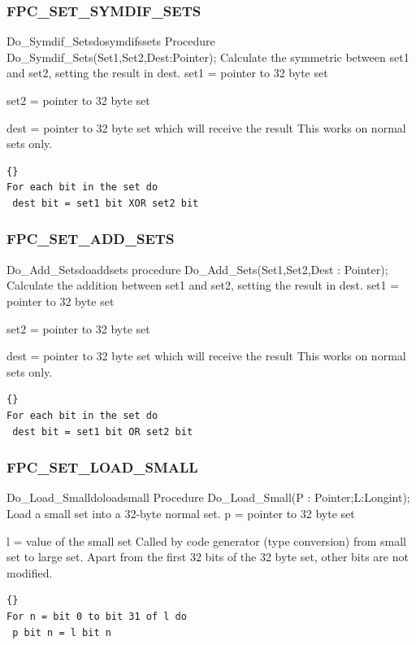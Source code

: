 \documentclass [12pt]{article}
\begin{document}
\subsubsection{FPC{\_}SET{\_}SYMDIF{\_}SETS}
\label{subsubsec:mylabel93}

\begin{procedurel}{Do{\_}Symdif{\_}Sets}{dosymdifssets}
\Declaration
Procedure Do{\_}Symdif{\_}Sets(Set1,Set2,Dest:Pointer);
\Description 
Calculate the symmetric between \textsf{set1} and \textsf{set2}, setting the
result in \textsf{dest}.
\Parameters 
set1 = pointer to 32 byte set \par
set2 = pointer to 32 byte set \par
dest = pointer to 32 byte set which will receive the result 
\Notes 
This works on normal sets only. 
\Algorithm 
\begin{lstlisting}{}
For each bit in the set do 
 dest bit = set1 bit XOR set2 bit
\end{lstlisting}
\end{procedurel}

\subsubsection{FPC{\_}SET{\_}ADD{\_}SETS}
\label{subsubsec:mylabel94}

\begin{procedurel}{Do{\_}Add{\_}Sets}{doaddsets}
\Declaration
procedure Do{\_}Add{\_}Sets(Set1,Set2,Dest : Pointer);
\Description 
Calculate the addition between \textsf{set1} and \textsf{set2}, setting the
result in \textsf{dest}.
\Parameters 
set1 = pointer to 32 byte set \par
set2 = pointer to 32 byte set \par 
dest = pointer to 32 byte set which will receive the result 
\Notes 
This works on normal sets only. 
\Algorithm 
\begin{lstlisting}{}
For each bit in the set do
 dest bit = set1 bit OR set2 bit
\end{lstlisting}
\end{procedurel}

\subsubsection{FPC{\_}SET{\_}LOAD{\_}SMALL}
\label{subsubsec:mylabel95}

\begin{procedurel}{Do{\_}Load{\_}Small}{doloadsmall}
\Declaration
Procedure Do{\_}Load{\_}Small(P : Pointer;L:Longint);
\Description 
Load a small set into a 32-byte normal set. 
\Parameters 
p = pointer to 32 byte set \par 
l = value of the small set 
\Notes 
Called by code generator (type conversion) from small set to large set.
Apart from the first 32 bits of the 32 byte set, other bits are not
modified.
\Algorithm 
\begin{lstlisting}{}
For n = bit 0 to bit 31 of l do
 p bit n = l bit n
\end{lstlisting}
\end{procedurel}
\end{document}
